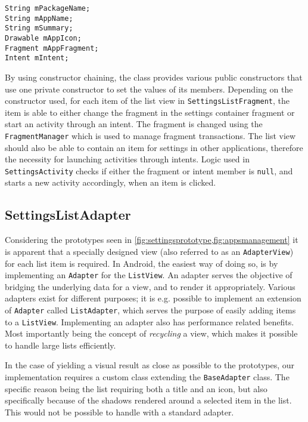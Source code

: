 \begin{lstlisting}[caption={Members of the \lstinline|SettingsListItem| class.}, label={lst:settingslistitem}]
String mPackageName;
String mAppName;
String mSummary;
Drawable mAppIcon;
Fragment mAppFragment;
Intent mIntent;
\end{lstlisting}

By using constructor chaining, the class provides various public constructors that use one private constructor to set the values of its members.
Depending on the constructor used, for each item of the list view in \lstinline|SettingsListFragment|, the item is able to either change the fragment in the settings container fragment or start an activity through an intent.
The fragment is changed using the \lstinline|FragmentManager| which is used to manage fragment transactions.
The list view should also be able to contain an item for settings in other \giraf applications, therefore the necessity for launching activities through intents.
Logic used in \lstinline|SettingsActivity| checks if either the fragment or intent member is \lstinline|null|, and starts a new activity accordingly, when an item is clicked.

\subsection{SettingsListAdapter}\label{sec:settingslistadapter}
Considering the prototypes seen in \cref{fig:settingsprototype,fig:appsmanagement} it is apparent that a specially designed view (also referred to as an \lstinline|AdapterView|) for each list item is required.
In Android, the easiest way of doing so, is by implementing an \lstinline|Adapter| for the \lstinline|ListView|.
An adapter serves the objective of bridging the underlying data for a view, and to render it appropriately.
Various adapters exist for different purposes; it is e.g. possible to implement an extension of \lstinline|Adapter| called \lstinline|ListAdapter|, which serves the purpose of easily adding items to a \lstinline|ListView|.
Implementing an adapter also has performance related benefits.
Most importantly being the concept of \textit{recycling} a view, which makes it possible to handle large lists efficiently.

In the case of yielding a visual result as close as possible to the prototypes, our implementation requires a custom class extending the \lstinline|BaseAdapter| class.
The specific reason being the list requiring both a title and an icon, but also specifically because of the shadows rendered around a selected item in the list.
This would not be possible to handle with a standard adapter.

